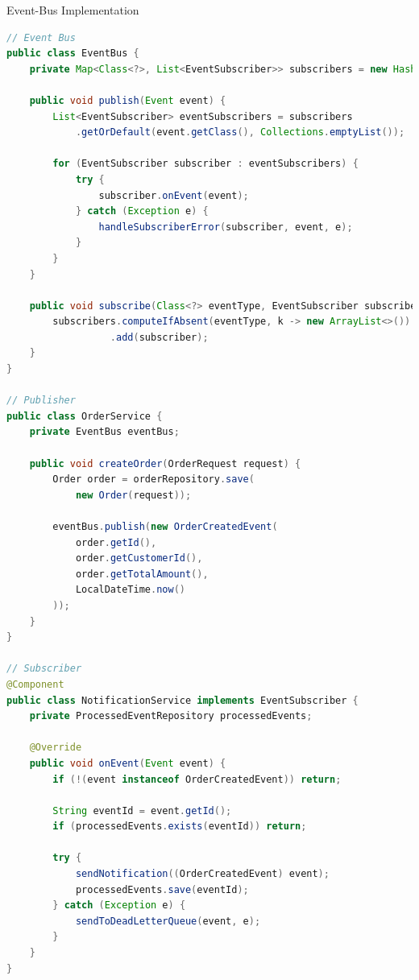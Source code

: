 \begin{example2}{Event-Bus Implementation}
\begin{lstlisting}[language=Java, style=basesmol]
// Event Bus
public class EventBus {
    private Map<Class<?>, List<EventSubscriber>> subscribers = new HashMap<>();
    
    public void publish(Event event) {
        List<EventSubscriber> eventSubscribers = subscribers
            .getOrDefault(event.getClass(), Collections.emptyList());
            
        for (EventSubscriber subscriber : eventSubscribers) {
            try {
                subscriber.onEvent(event);
            } catch (Exception e) {
                handleSubscriberError(subscriber, event, e);
            }
        }
    }
    
    public void subscribe(Class<?> eventType, EventSubscriber subscriber) {
        subscribers.computeIfAbsent(eventType, k -> new ArrayList<>())
                  .add(subscriber);
    }
}

// Publisher
public class OrderService {
    private EventBus eventBus;
    
    public void createOrder(OrderRequest request) {
        Order order = orderRepository.save(
            new Order(request));
            
        eventBus.publish(new OrderCreatedEvent(
            order.getId(),
            order.getCustomerId(),
            order.getTotalAmount(),
            LocalDateTime.now()
        ));
    }
}

// Subscriber
@Component
public class NotificationService implements EventSubscriber {
    private ProcessedEventRepository processedEvents;
    
    @Override
    public void onEvent(Event event) {
        if (!(event instanceof OrderCreatedEvent)) return;
        
        String eventId = event.getId();
        if (processedEvents.exists(eventId)) return;
        
        try {
            sendNotification((OrderCreatedEvent) event);
            processedEvents.save(eventId);
        } catch (Exception e) {
            sendToDeadLetterQueue(event, e);
        }
    }
}
\end{lstlisting}
\end{example2}

